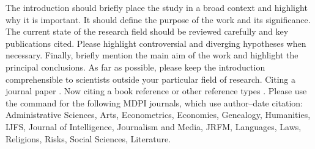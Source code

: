 \documentclass[journal,article,submit,pdftex,moreauthors]{Definitions/mdpi}
\begin{document}
The introduction should briefly place the study in a broad context and highlight why it is important. It should define the purpose of the work and its significance. The current state of the research field should be reviewed carefully and key publications cited. Please highlight controversial and diverging hypotheses when necessary. Finally, briefly mention the main aim of the work and highlight the principal conclusions. As far as possible, please keep the introduction comprehensible to scientists outside your particular field of research. Citing a journal paper \cite{ref-journal}. Now citing a book reference \cite{ref-book1,ref-book2} or other reference types \cite{ref-unpublish,ref-communication,ref-proceeding}. Please use the command \citep{ref-thesis,ref-url} for the following MDPI journals, which use author--date citation: Administrative Sciences, Arts, Econometrics, Economies, Genealogy, Humanities, IJFS, Journal of Intelligence, Journalism and Media, JRFM, Languages, Laws, Religions, Risks, Social Sciences, Literature.
%
%
%

\end{document}
